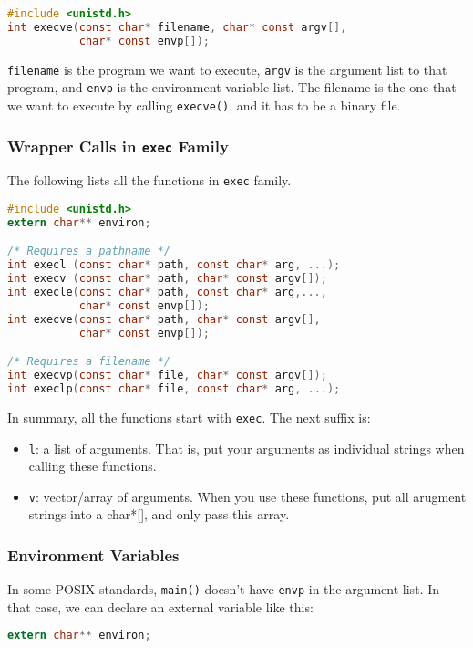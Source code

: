 \documentclass{article}
\renewcommand{\b}{\item[$\circ$]}
\newcommand{\newlist}{\begin{itemize}}
\renewcommand{\endlist}{\end{itemize}}
\newcommand{\code}[1]{\texttt{#1}}
\begin{document}
\begin{lstlisting}[language=C]
#include <unistd.h>
int execve(const char* filename, char* const argv[],
           char* const envp[]);
\end{lstlisting}

\code{filename} is the program we want to execute, \code{argv} is the argument list to that program, and \code{envp} is the environment variable list. The filename is the one that we want to execute by calling \code{execve()}, and it has to be a binary file. 

\subsubsection{Wrapper Calls in \code{exec} Family}

The following lists all the functions in \code{exec} family. 

\begin{lstlisting}[language=C]
#include <unistd.h>
extern char** environ;

/* Requires a pathname */
int execl (const char* path, const char* arg, ...);
int execv (const char* path, char* const argv[]);
int execle(const char* path, const char* arg,...,
           char* const envp[]);
int execve(const char* path, char* const argv[],
           char* const envp[]);

/* Requires a filename */
int execvp(const char* file, char* const argv[]);
int execlp(const char* file, const char* arg, ...);
\end{lstlisting}

In summary, all the functions start with \code{exec}. The next suffix is:

\newlist
\b \code{l}: a list of arguments. That is, put your arguments as individual strings when calling these functions.
\b \code{v}: vector/array of arguments. When you use these functions, put all arugment strings into a char*[], and only pass this array.
\endlist

\subsubsection{Environment Variables}

In some POSIX standards, \code{main()} doesn't have \code{envp} in the argument list. In that case, we can declare an external variable like this:

\begin{lstlisting}[language=C]
extern char** environ;
\end{lstlisting}
\end{document}
